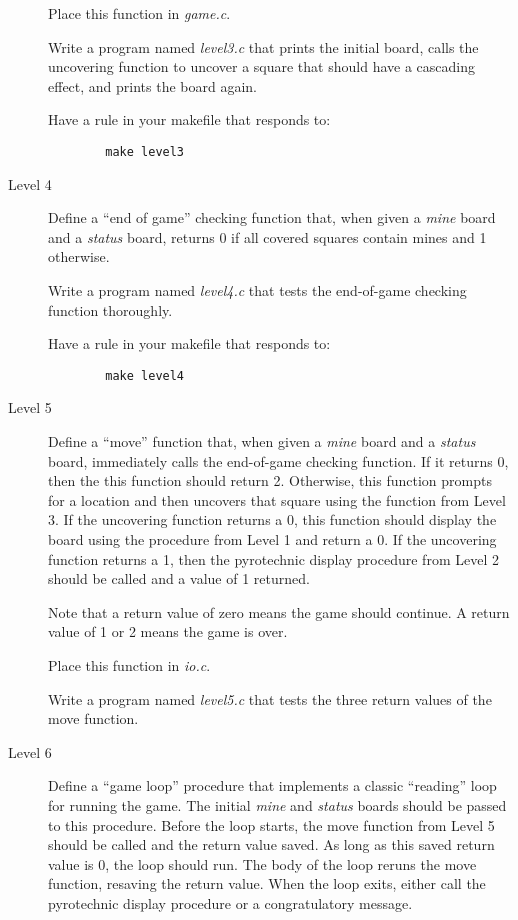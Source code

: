 \documentclass{article}
\begin{document}
\begin{description}
    Place this function in {\it game.c}.

    Write a program named {\it level3.c} that 
    prints the initial board, calls the uncovering function
    to uncover
    a square that should have a cascading effect, and prints the board again.

    Have a rule in your makefile that responds to:

\begin{verbatim}
        make level3
\end{verbatim}

\item[Level 4]
    Define a ``end of game'' checking 
    function that, when given a {\it mine} board and a {\it
    status} board, returns 0 if all covered squares contain mines and
    1 otherwise.

    Write a program named {\it level4.c} that 
    tests the end-of-game checking function thoroughly.

    Have a rule in your makefile that responds to:

\begin{verbatim}
        make level4
\end{verbatim}

\item[Level 5]
    Define a ``move'' function that, when given a {\it mine} board and a {\it
    status} board, immediately calls the end-of-game checking function.
    If it returns 0, then the this function should return 2.
    Otherwise, this function prompts for a location
    and then uncovers that square
    using the function from Level 3. If the uncovering function returns
    a 0, this function should display the board using the procedure from
    Level 1 and return a 0. If the uncovering function returns a 1, then
    the pyrotechnic display procedure from Level 2 should be called and
    a value of 1 returned.

    Note that a return value of zero means the game should continue. A
    return value of 1 or 2 means the game is over.

    Place this function in {\it io.c}.

    Write a program named {\it level5.c} that 
    tests the three return values of the move function.

\item[Level 6]
    Define a ``game loop'' procedure that implements a classic
    ``reading'' loop for
    running the game.  The initial {\it mine} and {\it status} boards should
    be passed to this procedure.
    Before the loop starts, the move function from Level
    5 should be called and the return value saved. As long as this saved
    return value is 0, the loop should run. The body of the loop reruns
    the move function, resaving the return value.
    When the loop exits, either call the pyrotechnic display procedure
    or a congratulatory message.


\end{description}
\end{document}
